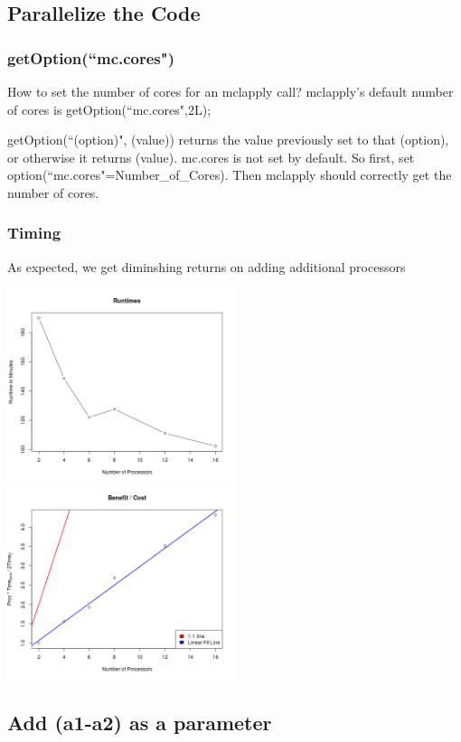\subsection{Parallelize the Code}

\subsubsection{getOption(``mc.cores")}
How to set the number of cores for an mclapply call? mclapply's default number of cores is getOption(``mc.cores",2L);

getOption(``(option)", (value)) returns the value previously set to that (option), or otherwise it returns (value). mc.cores is not set by default. So first, set option(``mc.cores"=Number\_of\_Cores). Then mclapply should correctly get the number of cores.

\subsubsection{Timing}

As expected, we get diminshing returns on adding additional processors

\includegraphics[width=0.5\textwidth]{data/1105runtimes.png}
\includegraphics[width=0.5\textwidth]{data/1105timingCostBenefit.png}


\subsection{Add (a1-a2) as a parameter}

